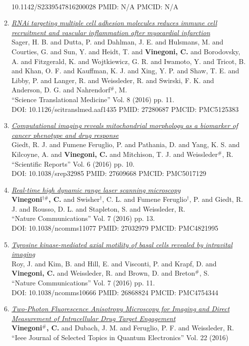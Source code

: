 \documentclass{resume}
\begin{document}
\begin{category}{~~}
\begin{enumerate}
10.1142/S2339547816200028 PMID: N/A PMCID: N/A\item \href{https://cvinegoni.github.io/assets/pdf/papers/2016-STM.pdf}{\it  RNAi targeting multiple cell adhesion molecules reduces immune cell recruitment and vascular inflammation after myocardial infarction} \\ Sager, H. B. and Dutta, P. and Dahlman, J. E. and Hulsmans, M. and Courties, G. and Sun, Y. and Heidt, T. and {\bf Vinegoni, C.} and Borodovsky, A. and Fitzgerald, K. and Wojtkiewicz, G. R. and Iwamoto, Y. and Tricot, B. and Khan, O. F. and Kauffman, K. J. and Xing, Y. P. and Shaw, T. E. and Libby, P. and Langer, R. and Weissleder, R. and Swirski, F. K. and Anderson, D. G. and Nahrendorf$^\#$, M. \\ ``Science Translational Medicine'' Vol. 8 (2016) pp. 11. \\ DOI: 10.1126/scitranslmed.aaf1435 PMID: 27280687 PMCID: PMC5125383\item \href{https://cvinegoni.github.io/assets/pdf/papers/2016-SCIREP.pdf}{\it  Computational imaging reveals mitochondrial morphology as a biomarker of cancer phenotype and drug response} \\ Giedt, R. J. and Fumene Feruglio, P. and Pathania, D. and Yang, K. S. and Kilcoyne, A. and {\bf Vinegoni, C.} and Mitchison, T. J. and Weissleder$^\#$, R. \\ ``Scientific Reports'' Vol. 6 (2016) pp. 10. \\ DOI: 10.1038/srep32985 PMID: 27609668 PMCID: PMC5017129\item \href{https://cvinegoni.github.io/assets/pdf/papers/2016-NCOMM-2.pdf}{\it  Real-time high dynamic range laser scanning microscopy} \\ {\bf Vinegoni$^{\dag \#}$, C.} and Swisher$^\dag$, C. L. and Fumene Feruglio$^\dag$, P. and Giedt, R. J. and Rousso, D. L. and Stapleton, S. and Weissleder, R. \\ ``Nature Communications'' Vol. 7 (2016) pp. 13. \\ DOI: 10.1038/ncomms11077 PMID: 27032979 PMCID: PMC4821995\item \href{https://cvinegoni.github.io/assets/pdf/papers/2016-NCOMM-1.pdf}{\it  Tyrosine kinase-mediated axial motility of basal cells revealed by intravital imaging} \\ Roy, J. and Kim, B. and Hill, E. and Visconti, P. and Krapf, D. and {\bf Vinegoni, C.} and Weissleder, R. and Brown, D. and Breton$^\#$, S. \\ ``Nature Communications'' Vol. 7 (2016) pp. 11. \\ DOI: 10.1038/ncomms10666 PMID: 26868824 PMCID: PMC4754344\item \href{https://cvinegoni.github.io/assets/pdf/papers/2016-IEEE.pdf}{\it  Two-Photon Fluorescence Anisotropy Microscopy for Imaging and Direct Measurement of Intracellular Drug Target Engagement} \\ {\bf Vinegoni$^\#$, C.} and Dubach, J. M. and Feruglio, P. F. and Weissleder, R. \\ ``Ieee Journal of Selected Topics in Quantum Electronics'' Vol. 22 (2016) 
\end{enumerate}
\end{category}
\end{document}
